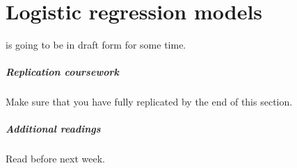 %
%
\chapter[Logistic models]{Logistic regression models}%
	\label{ch:log}%
  \begin{mybox}
     is going to be in draft form for some time.%

    \paragraph{Replication coursework} %
    Make sure that you have fully replicated  by the end of this section.%

    \paragraph{Additional readings} %
    Read \citeauthor[ch.~12.1–12.2 and 13.1–13.3]{FeinsteinThomas:2002d} before next week.%
    
  \end{mybox}

%
%
%
%
%
%
%
%
%